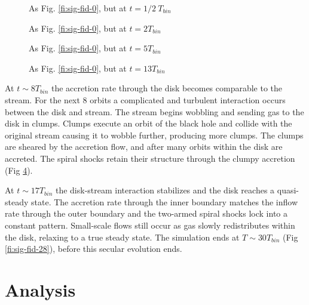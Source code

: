 \documentclass{emulateapj}
\begin{document}
\begin{figure}
\caption{\label{fi:sig-fid-05} As Fig. \ref{fi:sig-fid-0}, but at $t = 1/2\ T_{bin}$}
\end{figure}

\begin{figure}
\caption{\label{fi:sig-fid-2} As Fig. \ref{fi:sig-fid-0}, but at $t = 2 T_{bin}$}
\end{figure}

\begin{figure}
\caption{\label{fi:sig-fid-5} As Fig. \ref{fi:sig-fid-0}, but at $t = 5 T_{bin}$}
\end{figure}

\begin{figure}
\caption{\label{fi:sig-fid-13} As Fig. \ref{fi:sig-fid-0}, but at $t = 13 T_{bin}$}
\end{figure}


At $t\sim 8 T_{bin}$ the accretion rate through the disk becomes comparable to the stream.  For the next 8 orbits a complicated and turbulent interaction occurs between the disk and stream.  The stream begins wobbling and sending gas to the disk in clumps.  Clumps execute an orbit of the black hole and collide with the original stream causing it to wobble further, producing more clumps.  The clumps are sheared by the accretion flow, and after many orbits within the disk are accreted. The spiral shocks retain their structure through the clumpy accretion (Fig \ref{fi:sig-fid-13}).

At $t\sim17 T_{bin}$ the disk-stream interaction stabilizes and the disk reaches a quasi-steady state.  The accretion rate through the inner boundary matches the inflow rate through the outer boundary and the two-armed spiral shocks lock into a constant pattern.  Small-scale flows still occur as gas slowly redistributes within the disk, relaxing to a true steady state.  The simulation ends at $T\sim30 T_{bin}$ (Fig \ref{fi:sig-fid-28}), before this secular evolution ends.

\begin{figure*}
\caption{\label{fi:sig-fid-28} As Fig. \ref{fi:sig-fid-0}, but at $t = 28 T_{bin}$}
\end{figure*}



\section{Analysis}
\label{sec:analysis}
\end{document}
